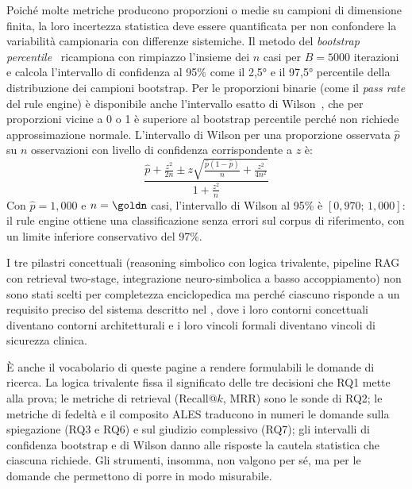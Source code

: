 Poiché molte metriche producono proporzioni o medie su campioni di dimensione
finita, la loro incertezza statistica deve essere quantificata per non
confondere la variabilità campionaria con differenze sistemiche. Il metodo
del \emph{bootstrap percentile}~\cite{efron1979bootstrap} ricampiona con
rimpiazzo l'insieme dei $n$ casi per $B = 5000$ iterazioni e calcola
l'intervallo di confidenza al 95\% come il 2,5° e il 97,5° percentile della
distribuzione dei campioni bootstrap. Per le proporzioni binarie (come il
\emph{pass rate} del rule engine) è disponibile anche l'intervallo esatto
di Wilson~\cite{wilson1927ci}, che per proporzioni vicine a 0 o 1 è
superiore al bootstrap percentile perché non richiede approssimazione normale.
L'intervallo di Wilson per una proporzione osservata $\hat{p}$ su $n$
osservazioni con livello di confidenza corrispondente a $z$ è:
\[
  \frac{\hat{p} + \frac{z^2}{2n} \pm z\sqrt{\frac{\hat{p}(1-\hat{p})}{n} + \frac{z^2}{4n^2}}}{1 + \frac{z^2}{n}}
\]
Con $\hat{p} = 1{,}000$ e $n = \goldn$ casi, l'intervallo di Wilson al 95\%
è $[0{,}970;\,1{,}000]$: il rule engine ottiene una classificazione senza errori
sul corpus di riferimento, con un limite inferiore conservativo del 97\%.


I tre pilastri concettuali (reasoning simbolico con logica trivalente,
pipeline RAG con retrieval two-stage, integrazione neuro-simbolica a basso
accoppiamento) non sono stati scelti per completezza enciclopedica ma
perché ciascuno risponde a un requisito preciso del sistema descritto nel
, dove i loro contorni concettuali diventano contorni
architetturali e i loro vincoli formali diventano vincoli di sicurezza
clinica.

È anche il vocabolario di queste pagine a rendere formulabili le domande di
ricerca. La logica trivalente fissa il significato delle tre decisioni che RQ1
mette alla prova; le metriche di retrieval (Recall@$k$, MRR) sono le sonde di
RQ2; le metriche di fedeltà e il composito ALES traducono in numeri le domande
sulla spiegazione (RQ3 e RQ6) e sul giudizio complessivo (RQ7); gli intervalli
di confidenza bootstrap e di Wilson danno alle risposte la cautela statistica
che ciascuna richiede. Gli strumenti, insomma, non valgono per sé, ma per le
domande che permettono di porre in modo misurabile.
